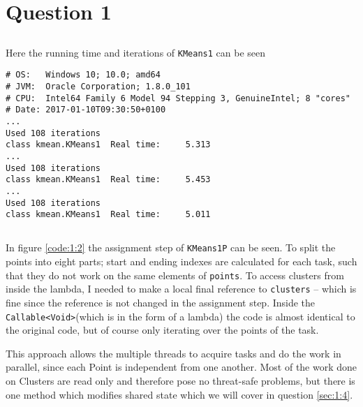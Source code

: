 \section{Question 1}

\subsection{}
Here the running time and iterations of \texttt{KMeans1} can be seen

\begin{lstlisting}
# OS:   Windows 10; 10.0; amd64
# JVM:  Oracle Corporation; 1.8.0_101
# CPU:  Intel64 Family 6 Model 94 Stepping 3, GenuineIntel; 8 "cores"
# Date: 2017-01-10T09:30:50+0100
...
Used 108 iterations
class kmean.KMeans1  Real time:     5.313
...
Used 108 iterations
class kmean.KMeans1  Real time:     5.453
...
Used 108 iterations
class kmean.KMeans1  Real time:     5.011
\end{lstlisting}

\subsection{}
In figure \ref{code:1:2} the assignment step of \texttt{KMeans1P} can be seen. To split the points into eight parts; start and ending indexes are calculated for each task, such that they do not work on the same elements of \texttt{points}. To access clusters from inside the lambda, I needed to make a local final reference to \texttt{clusters} -- which is fine since the reference is not changed in the assignment step. Inside the \texttt{Callable<Void>}(which is in the form of a lambda) the code is almost identical to the original code, but of course only iterating over the points of the task.

\newpar This approach allows the multiple threads to acquire tasks and do the work in parallel, since each Point is independent from one another. Most of the work done on Clusters are read only and therefore pose no threat-safe problems, but there is one method which modifies shared state which we will cover in question \ref{sec:1:4}.


